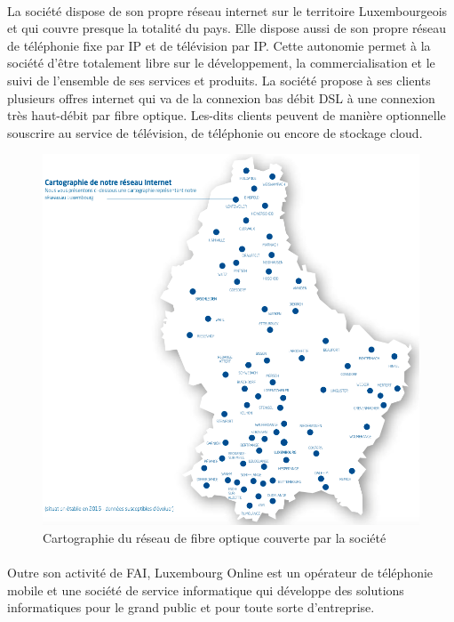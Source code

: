 \paragraph*{}
La société dispose de son propre réseau internet sur le territoire Luxembourgeois et qui couvre presque la totalité du pays. Elle dispose aussi de son propre réseau de téléphonie fixe par IP et de télévision par IP. Cette autonomie permet à la société  d'être totalement libre sur le développement, la commercialisation et le suivi de l'ensemble de ses services et produits. La société propose à ses clients plusieurs offres internet qui va de la connexion bas débit DSL à une connexion très haut-débit par fibre optique. Les-dits clients peuvent de manière optionnelle souscrire au service de télévision, de téléphonie ou encore de stockage cloud.

\begin{figure}[H]
	\centering
	\includegraphics[scale=0.3]{assets/images/cartographie}
	\caption{Cartographie du réseau de fibre optique couverte par la société}
	\label{fig.2}
\end{figure}

\paragraph*{}

Outre son activité de FAI, Luxembourg Online est un opérateur de téléphonie mobile et une société de service informatique qui développe des solutions informatiques pour le grand public et pour toute sorte d'entreprise.

